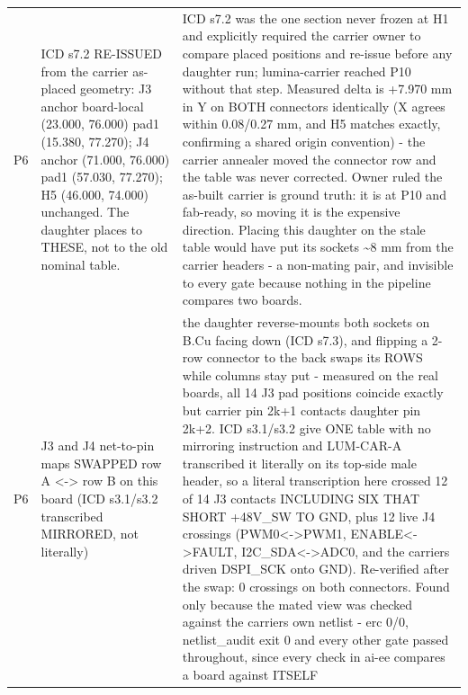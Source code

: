 \documentclass[11pt,a4paper]{article}
\begin{document}
{\begin{longtable}{lp{5.2cm}p{7.2cm}}
P6 & ICD s7.2 RE-ISSUED from the carrier as-placed geometry: J3 anchor board-local (23.000, 76.000) pad1 (15.380, 77.270); J4 anchor (71.000, 76.000) pad1 (57.030, 77.270); H5 (46.000, 74.000) unchanged. The daughter places to THESE, not to the old nominal table. & ICD s7.2 was the one section never frozen at H1 and explicitly required the carrier owner to compare placed positions and re-issue before any daughter run; lumina-carrier reached P10 without that step. Measured delta is +7.970 mm in Y on BOTH connectors identically (X agrees within 0.08/0.27 mm, and H5 matches exactly, confirming a shared origin convention) - the carrier annealer moved the connector row and the table was never corrected. Owner ruled the as-built carrier is ground truth: it is at P10 and fab-ready, so moving it is the expensive direction. Placing this daughter on the stale table would have put its sockets \textasciitilde{}8 mm from the carrier headers - a non-mating pair, and invisible to every gate because nothing in the pipeline compares two boards. \\
P6 & J3 and J4 net-to-pin maps SWAPPED row A \textless{}-\textgreater{} row B on this board (ICD s3.1/s3.2 transcribed MIRRORED, not literally) & the daughter reverse-mounts both sockets on B.Cu facing down (ICD s7.3), and flipping a 2-row connector to the back swaps its ROWS while columns stay put - measured on the real boards, all 14 J3 pad positions coincide exactly but carrier pin 2k+1 contacts daughter pin 2k+2. ICD s3.1/s3.2 give ONE table with no mirroring instruction and LUM-CAR-A transcribed it literally on its top-side male header, so a literal transcription here crossed 12 of 14 J3 contacts INCLUDING SIX THAT SHORT +48V\_SW TO GND, plus 12 live J4 crossings (PWM0\textless{}-\textgreater{}PWM1, ENABLE\textless{}-\textgreater{}FAULT, I2C\_SDA\textless{}-\textgreater{}ADC0, and the carriers driven DSPI\_SCK onto GND). Re-verified after the swap: 0 crossings on both connectors. Found only because the mated view was checked against the carriers own netlist - erc 0/0, netlist\_audit exit 0 and every other gate passed throughout, since every check in ai-ee compares a board against ITSELF \\

\end{longtable}}
\end{document}
